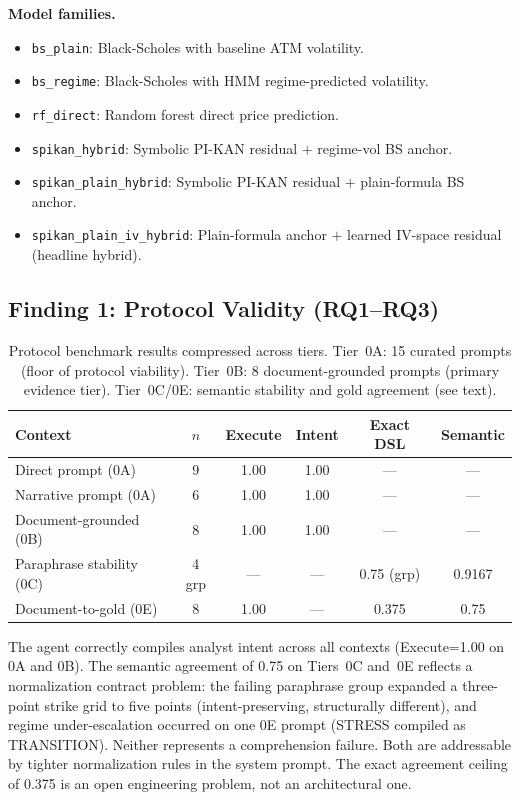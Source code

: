 \documentclass[11pt,a4paper]{article}
\begin{document}
\textbf{Model families.}
\begin{itemize}[nosep]
  \item \texttt{bs\_plain}: Black-Scholes with baseline ATM volatility.
  \item \texttt{bs\_regime}: Black-Scholes with HMM regime-predicted volatility.
  \item \texttt{rf\_direct}: Random forest direct price prediction.
  \item \texttt{spikan\_hybrid}: Symbolic PI-KAN residual $+$ regime-vol BS anchor.
  \item \texttt{spikan\_plain\_hybrid}: Symbolic PI-KAN residual $+$ plain-formula BS anchor.
  \item \texttt{spikan\_plain\_iv\_hybrid}: Plain-formula anchor $+$ learned IV-space residual (headline hybrid).
\end{itemize}

\subsection{Finding 1: Protocol Validity (RQ1--RQ3)}
\label{sec:experiments:protocol}

\begin{table}[ht]
\centering
\caption{Protocol benchmark results compressed across tiers. Tier~0A: 15 curated
prompts (floor of protocol viability). Tier~0B: 8 document-grounded prompts (primary
evidence tier). Tier~0C/0E: semantic stability and gold agreement (see text).}
\begin{tabular}{@{}lccccc@{}}
\toprule
Context & $n$ & Execute & Intent & Exact DSL & Semantic \\ \midrule
Direct prompt (0A) & 9 & 1.00 & 1.00 & --- & --- \\
Narrative prompt (0A) & 6 & 1.00 & 1.00 & --- & --- \\
Document-grounded (0B) & 8 & 1.00 & 1.00 & --- & --- \\
Paraphrase stability (0C) & 4 grp & --- & --- & 0.75 (grp) & 0.9167 \\
Document-to-gold (0E) & 8 & 1.00 & --- & 0.375 & 0.75 \\ \bottomrule
\end{tabular}
\label{tab:protocol}
\end{table}

The agent correctly compiles analyst intent across all contexts (Execute=1.00 on 0A
and 0B). The semantic agreement of 0.75 on Tiers~0C and~0E reflects a normalization
contract problem: the failing paraphrase group expanded a three-point strike grid to
five points (intent-preserving, structurally different), and regime under-escalation
occurred on one 0E prompt (STRESS compiled as TRANSITION). Neither represents a
comprehension failure. Both are addressable by tighter normalization rules in the
system prompt. The exact agreement ceiling of 0.375 is an open engineering problem,
not an architectural one.
\end{document}
